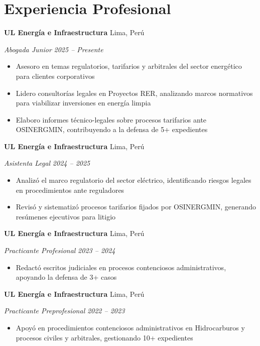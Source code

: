 \documentclass[10pt,letterpaper]{article}
\newcommand{\entry}[4]{%
  \noindent\textbf{#1} \hfill #2 \par\nopagebreak
  \textit{#3} \hfill \textit{#4} \par\nopagebreak
}
\begin{document}
\section{Experiencia Profesional}

\entry{UL Energ\'ia e Infraestructura}{Lima, Per\'u}{Abogada Junior}{2025 -- Presente}
\begin{itemize}
  \item Asesoro en temas regulatorios, tarifarios y arbitrales del sector energ\'etico para clientes corporativos
  \item Lidero consultor\'ias legales en Proyectos RER, analizando marcos normativos para viabilizar inversiones en energ\'ia limpia
  \item Elaboro informes t\'ecnico-legales sobre procesos tarifarios ante OSINERGMIN, contribuyendo a la defensa de 5+ expedientes
\end{itemize}
\vspace{0.2em}

\entry{UL Energ\'ia e Infraestructura}{Lima, Per\'u}{Asistenta Legal}{2024 -- 2025}
\begin{itemize}
  \item Analiz\'o el marco regulatorio del sector el\'ectrico, identificando riesgos legales en procedimientos ante reguladores
  \item Revis\'o y sistematiz\'o procesos tarifarios fijados por OSINERGMIN, generando res\'umenes ejecutivos para litigio
\end{itemize}
\vspace{0.2em}

\entry{UL Energ\'ia e Infraestructura}{Lima, Per\'u}{Practicante Profesional}{2023 -- 2024}
\begin{itemize}
  \item Redact\'o escritos judiciales en procesos contenciosos administrativos, apoyando la defensa de 3+ casos
\end{itemize}
\vspace{0.2em}

\entry{UL Energ\'ia e Infraestructura}{Lima, Per\'u}{Practicante Preprofesional}{2022 -- 2023}
\begin{itemize}
  \item Apoy\'o en procedimientos contenciosos administrativos en Hidrocarburos y procesos civiles y arbitrales, gestionando 10+ expedientes
\end{itemize}
\vspace{0.2em}
\end{document}
